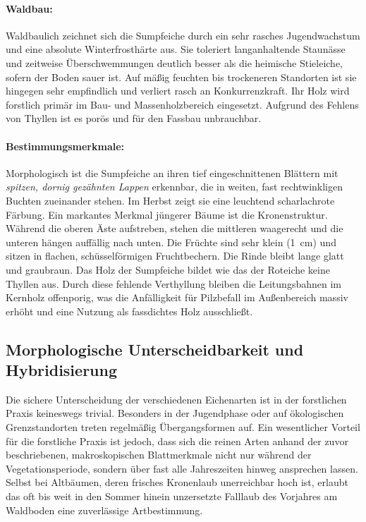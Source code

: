 \documentclass[twocolumn, bibliography=totoc, abstract=true]{scrartcl}
\begin{document}
\paragraph{Waldbau:}
Waldbaulich zeichnet sich die Sumpfeiche durch ein sehr rasches Jugendwachstum und eine absolute Winterfrosthärte aus. Sie toleriert langanhaltende Staunässe und zeitweise Überschwemmungen deutlich besser als die heimische Stieleiche, sofern der Boden sauer ist. Auf mäßig feuchten bis trockeneren Standorten ist sie hingegen sehr empfindlich und verliert rasch an Konkurrenzkraft. Ihr Holz wird forstlich primär im Bau- und Massenholzbereich eingesetzt. Aufgrund des Fehlens von Thyllen ist es porös und für den Fassbau unbrauchbar.

\paragraph{Bestimmungsmerkmale:}
Morphologisch ist die Sumpfeiche an ihren tief eingeschnittenen Blättern mit \emph{spitzen, dornig gezähnten Lappen} erkennbar, die in weiten, fast rechtwinkligen Buchten zueinander stehen. Im Herbst zeigt sie eine leuchtend scharlachrote Färbung. Ein markantes Merkmal jüngerer Bäume ist die Kronenstruktur. Während die oberen Äste aufstreben, stehen die mittleren waagerecht und die unteren hängen auffällig nach unten. Die Früchte sind sehr klein (\qty{1}{\cm}) und sitzen in flachen, schüsselförmigen Fruchtbechern. Die Rinde bleibt lange glatt und graubraun. Das Holz der Sumpfeiche bildet wie das der Roteiche keine Thyllen aus. Durch diese fehlende Verthyllung bleiben die Leitungsbahnen im Kernholz offenporig, was die Anfälligkeit für Pilzbefall im Außenbereich massiv erhöht und eine Nutzung als fassdichtes Holz ausschließt.

\subsection{Morphologische Unterscheidbarkeit und Hybridisierung}

Die sichere Unterscheidung der verschiedenen Eichenarten ist in der forstlichen Praxis keineswegs trivial. Besonders in der Jugendphase oder auf ökologischen Grenzstandorten treten regelmäßig Übergangsformen auf. Ein wesentlicher Vorteil für die forstliche Praxis ist jedoch, dass sich die reinen Arten anhand der zuvor beschriebenen, makroskopischen Blattmerkmale nicht nur während der Vegetationsperiode, sondern über fast alle Jahreszeiten hinweg ansprechen lassen. Selbst bei Altbäumen, deren frisches Kronenlaub unerreichbar hoch ist, erlaubt das oft bis weit in den Sommer hinein unzersetzte Falllaub des Vorjahres am Waldboden eine zuverlässige Artbestimmung.
\end{document}
